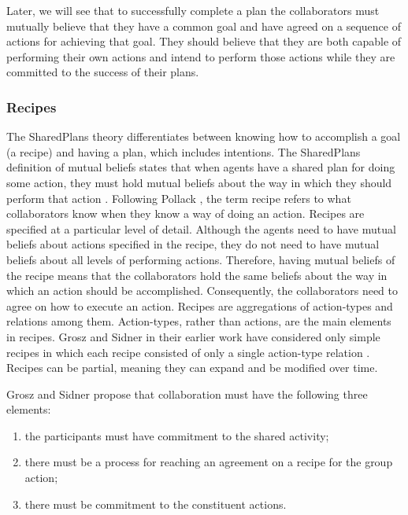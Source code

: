 \documentclass[12pt]{report}
\begin{document}
Later, we will see that to successfully complete a plan the collaborators must
mutually believe that they have a common goal and have agreed on a sequence of
actions for achieving that goal. They should believe that they are both capable
of performing their own actions and intend to perform those actions while they
are committed to the success of their plans.

\subsubsection{Recipes}
\label{sec:recipe}

The SharedPlans theory differentiates between knowing how to accomplish a goal
(a recipe) and having a plan, which includes intentions. The SharedPlans
definition of mutual beliefs states that when agents have a shared plan for
doing some action, they must hold mutual beliefs about the way in which they
should perform that action \cite{grosz:collaboration,grosz:plans-discourse}.
Following Pollack \cite{pollack:plan-mental-attitudes}, the term recipe refers
to what collaborators know when they know a way of doing an action. Recipes are
specified at a particular level of detail. Although the agents need to have
mutual beliefs about actions specified in the recipe, they do not need to have
mutual beliefs about all levels of performing actions. Therefore, having mutual
beliefs of the recipe means that the collaborators hold the same beliefs
about the way in which an action should be accomplished. Consequently, the
collaborators need to agree on how to execute an action. Recipes are
aggregations of action-types and relations among them. Action-types, rather than
actions, are the main elements in recipes. Grosz and Sidner in their earlier
work \cite{grosz:plans-discourse} have considered only simple recipes in which
each recipe consisted of only a single action-type relation
\cite{lochbaum:plan-models}. Recipes can be partial, meaning they can expand and
be modified over time.

Grosz and Sidner propose that collaboration must have the following three
elements:

\begin{enumerate}
  \item the participants must have commitment to the shared activity;
  \item there must be a process for reaching an agreement on a recipe for the
  group action;
  \item there must be commitment to the constituent actions. 
\end{enumerate}
\end{document}
